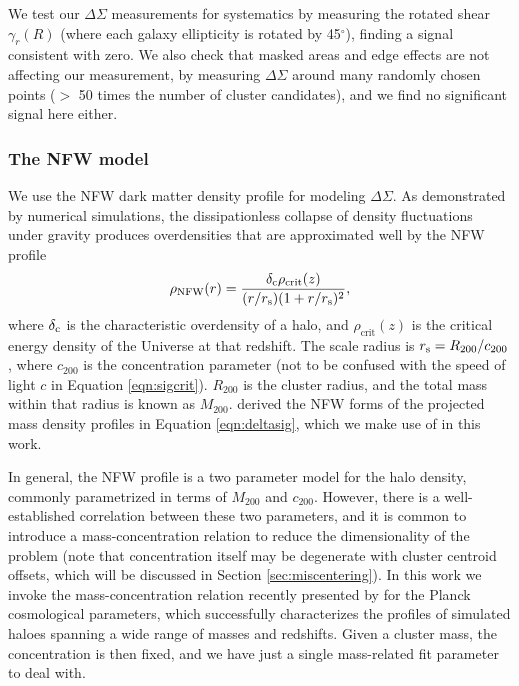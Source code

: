 We test our $\Delta\Sigma$ measurements for systematics by measuring the rotated shear $\gamma_r(R)$ (where each galaxy ellipticity is rotated by 45$^{\circ}$), finding a signal consistent with zero. We also check that masked areas and edge effects are not affecting our measurement, by measuring $\Delta\Sigma$ around many randomly chosen points ($>$ 50 times the number of cluster candidates), and we find no significant signal here either.

\subsubsection{The \ac{NFW} model}
\label{sec:nfw}

We use the \acf{NFW} dark matter density profile \citep{nfw97} for modeling $\Delta\Sigma$. As demonstrated by numerical simulations, the dissipationless collapse of density fluctuations under gravity produces overdensities that are approximated well by the \ac{NFW} profile
\begin{equation}
\rho_{\mathrm{NFW}}(r) = \frac{\delta_{\rm c} \rho_{\mathrm{crit}}(z)}{(r/r_{\rm s})(1+r/r_{\rm s})^2},
\end{equation}
where $\delta_{\rm c}$ is the characteristic overdensity of a halo, and $\rho_{\mathrm{crit}}(z)$ is the critical energy density of the Universe at that redshift. The scale radius is $r_{\rm s} = R_{200}/c_{200}$, where $c_{200}$ is the concentration parameter (not to be confused with the speed of light $c$ in Equation \ref{eqn:sigcrit}). $R_{200}$ is the cluster radius, and the total mass within that radius is known as $M_{200}$. \citet{Wright00} derived the \ac{NFW} forms of the projected mass density profiles in Equation \ref{eqn:deltasig}, which we make use of in this work.

In general, the \ac{NFW} profile is a two parameter model for the halo density, commonly parametrized in terms of $M_{200}$ and $c_{200}$. However, there is a well-established correlation between these two parameters, and it is common to introduce a mass-concentration relation to reduce the dimensionality of the problem (note that concentration itself may be degenerate with cluster centroid offsets, which will be discussed in Section \ref{sec:miscentering}). In this work we invoke the mass-concentration relation recently presented by \citet{Dutton14} for the \acs{Planck} cosmological parameters, which successfully characterizes the profiles of simulated haloes spanning a wide range of masses and redshifts. Given a cluster mass, the concentration is then fixed, and we have just a single mass-related fit parameter to deal with.



